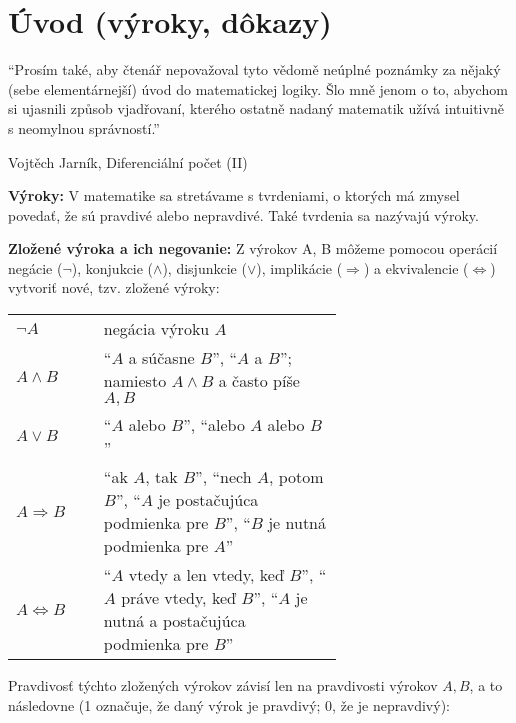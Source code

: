 \chapter*{Úvod (výroky, dôkazy)}

\epigraph{
  \enquote{Prosím také, aby čtenář nepovažoval tyto vědomě neúplné poznámky za
nějaký (sebe elementárnejší) úvod do matematickej logiky. Šlo mně jenom o to,
abychom si ujasnili způsob vjadřovaní, kterého ostatně nadaný matematik užívá
intuitivně s neomylnou správností.}
}{Vojtěch Jarník, Diferenciální počet (II)}

\textbf{Výroky:}
V matematike sa stretávame s tvrdeniami, o ktorých má
zmysel povedať, že sú pravdivé alebo nepravdivé. Také tvrdenia sa nazývajú
výroky.

\textbf{Zložené výroka a ich negovanie:}
Z výrokov A, B môžeme pomocou operácií negácie ($\neg$), konjukcie
($\land$), disjunkcie ($\lor$), implikácie ($\Rightarrow$) a ekvivalencie
($\iff$) vytvoriť nové, tzv. zložené výroky:

\begin{center}
  \begin{tabular}{ m{0.15\linewidth} p{0.5\linewidth} }
    $\neg A$ & negácia výroku $A$ \\
    \bigskip
    $A \land B$
      & \enquote{$A$ a súčasne $B$},
        \enquote{$A$ a $B$};
        namiesto $A \land B$ a často píše $A, B$ \\
    \bigskip
    $A \lor B$
      & \enquote{$A$ alebo $B$},
        \enquote{alebo $A$ alebo $B$} \\
    \bigskip
    $A \Rightarrow B$
      & \enquote{ak $A$, tak $B$},
        \enquote{nech $A$, potom $B$},
        \enquote{$A$ je postačujúca podmienka pre $B$},
        \enquote{$B$ je nutná podmienka pre $A$} \\
    \bigskip
    $A \iff B$
      & \enquote{$A$ vtedy a len vtedy, keď $B$},
        \enquote{$A$ práve vtedy, keď $B$},
        \enquote{$A$ je nutná a postačujúca podmienka pre $B$} \\
  \end{tabular}
\end{center}

Pravdivosť týchto zložených výrokov závisí len na pravdivosti výrokov $A, B$,
a to následovne (1 označuje, že daný výrok je pravdivý; 0, že je nepravdivý):

